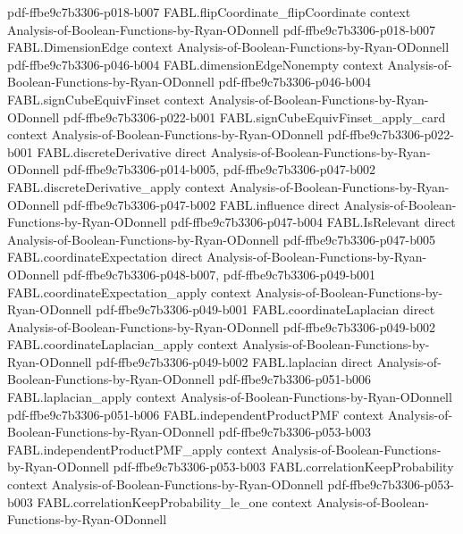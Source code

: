 \begin{theorem}
  {pdf-ffbe9c7b3306-p018-b007}
\proofstep
  {FABL.flipCoordinate_flipCoordinate}
  {context}
  {Analysis-of-Boolean-Functions-by-Ryan-ODonnell}
  {pdf-ffbe9c7b3306-p018-b007}
\proofstep
  {FABL.DimensionEdge}
  {context}
  {Analysis-of-Boolean-Functions-by-Ryan-ODonnell}
  {pdf-ffbe9c7b3306-p046-b004}
\proofstep
  {FABL.dimensionEdgeNonempty}
  {context}
  {Analysis-of-Boolean-Functions-by-Ryan-ODonnell}
  {pdf-ffbe9c7b3306-p046-b004}
\proofstep
  {FABL.signCubeEquivFinset}
  {context}
  {Analysis-of-Boolean-Functions-by-Ryan-ODonnell}
  {pdf-ffbe9c7b3306-p022-b001}
\proofstep
  {FABL.signCubeEquivFinset_apply_card}
  {context}
  {Analysis-of-Boolean-Functions-by-Ryan-ODonnell}
  {pdf-ffbe9c7b3306-p022-b001}
\proofstep
  {FABL.discreteDerivative}
  {direct}
  {Analysis-of-Boolean-Functions-by-Ryan-ODonnell}
  {pdf-ffbe9c7b3306-p014-b005,
    pdf-ffbe9c7b3306-p047-b002}
\proofstep
  {FABL.discreteDerivative_apply}
  {context}
  {Analysis-of-Boolean-Functions-by-Ryan-ODonnell}
  {pdf-ffbe9c7b3306-p047-b002}
\proofstep
  {FABL.influence}
  {direct}
  {Analysis-of-Boolean-Functions-by-Ryan-ODonnell}
  {pdf-ffbe9c7b3306-p047-b004}
\proofstep
  {FABL.IsRelevant}
  {direct}
  {Analysis-of-Boolean-Functions-by-Ryan-ODonnell}
  {pdf-ffbe9c7b3306-p047-b005}
\proofstep
  {FABL.coordinateExpectation}
  {direct}
  {Analysis-of-Boolean-Functions-by-Ryan-ODonnell}
  {pdf-ffbe9c7b3306-p048-b007,
    pdf-ffbe9c7b3306-p049-b001}
\proofstep
  {FABL.coordinateExpectation_apply}
  {context}
  {Analysis-of-Boolean-Functions-by-Ryan-ODonnell}
  {pdf-ffbe9c7b3306-p049-b001}
\proofstep
  {FABL.coordinateLaplacian}
  {direct}
  {Analysis-of-Boolean-Functions-by-Ryan-ODonnell}
  {pdf-ffbe9c7b3306-p049-b002}
\proofstep
  {FABL.coordinateLaplacian_apply}
  {context}
  {Analysis-of-Boolean-Functions-by-Ryan-ODonnell}
  {pdf-ffbe9c7b3306-p049-b002}
\proofstep
  {FABL.laplacian}
  {direct}
  {Analysis-of-Boolean-Functions-by-Ryan-ODonnell}
  {pdf-ffbe9c7b3306-p051-b006}
\proofstep
  {FABL.laplacian_apply}
  {context}
  {Analysis-of-Boolean-Functions-by-Ryan-ODonnell}
  {pdf-ffbe9c7b3306-p051-b006}
\proofstep
  {FABL.independentProductPMF}
  {context}
  {Analysis-of-Boolean-Functions-by-Ryan-ODonnell}
  {pdf-ffbe9c7b3306-p053-b003}
\proofstep
  {FABL.independentProductPMF_apply}
  {context}
  {Analysis-of-Boolean-Functions-by-Ryan-ODonnell}
  {pdf-ffbe9c7b3306-p053-b003}
\proofstep
  {FABL.correlationKeepProbability}
  {context}
  {Analysis-of-Boolean-Functions-by-Ryan-ODonnell}
  {pdf-ffbe9c7b3306-p053-b003}
\proofstep
  {FABL.correlationKeepProbability_le_one}
  {context}
  {Analysis-of-Boolean-Functions-by-Ryan-ODonnell}

\end{theorem}

